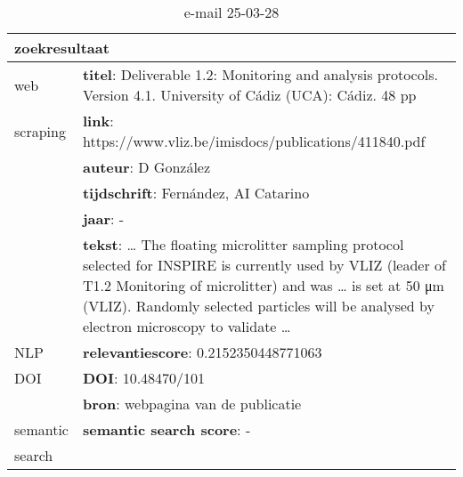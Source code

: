 \begin{table}[h!]
    \caption{e-mail 25-03-28}
    \centering
    \begin{tabularx}{\textwidth}{|p{4cm}|X|} 
        \hline
        \multicolumn{2}{|X|}{\textbf{zoekresultaat}} \\
        \hline
        web &\textbf{titel}: Deliverable 1.2: Monitoring and analysis protocols. Version 4.1. University of Cádiz (UCA): Cádiz. 48 pp\\
        scraping&\textbf{link}: https://www.vliz.be/imisdocs/publications/411840.pdf\\
        &\textbf{auteur}: D González\\
        &\textbf{tijdschrift}: Fernández, AI Catarino\\
        &\textbf{jaar}: -\\
        &\textbf{tekst}: … The floating microlitter sampling protocol selected for INSPIRE is currently used by VLIZ (leader of T1.2 Monitoring of microlitter) and was … is set at 50 μm (VLIZ). Randomly selected particles will be analysed by electron microscopy to validate …\\
        \hline
        NLP&\textbf{relevantiescore}: 0.2152350448771063\\
        \hline
        DOI&\textbf{DOI}: 10.48470/101\\
        &\textbf{bron}: webpagina van de publicatie\\
        \hline
        semantic&\textbf{semantic search score}: -\\
        search&\\
        \hline
    \end{tabularx}
    \label{table:email20250328}
\end{table}
